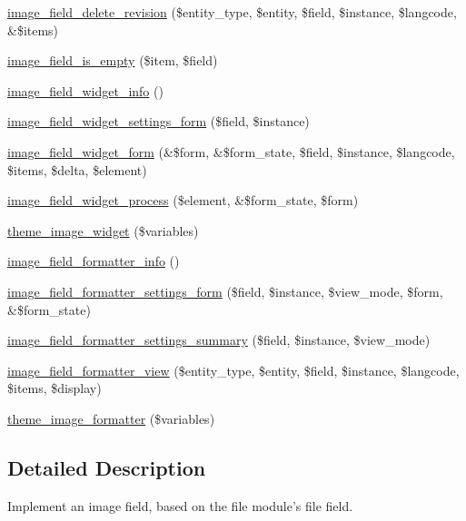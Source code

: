 \begin{DoxyCompactItemize}
\hyperlink{image_8field_8inc_a460a161a4443c74ca50c53a75c7136a4}{image\_\-field\_\-delete\_\-revision} (\$entity\_\-type, \$entity, \$field, \$instance, \$langcode, \&\$items)
\item 
\hyperlink{image_8field_8inc_ab622afc8da1677afd5a91fc89c1192e0}{image\_\-field\_\-is\_\-empty} (\$item, \$field)
\item 
\hyperlink{image_8field_8inc_a6ec5a26a8e2fcb61f177cccbe5e4e9a0}{image\_\-field\_\-widget\_\-info} ()
\item 
\hyperlink{image_8field_8inc_ab2ba9fe8f5569b05a3e8b5c28d0a62db}{image\_\-field\_\-widget\_\-settings\_\-form} (\$field, \$instance)
\item 
\hyperlink{image_8field_8inc_a31362f53c0480c28ab23092a49c329d8}{image\_\-field\_\-widget\_\-form} (\&\$form, \&\$form\_\-state, \$field, \$instance, \$langcode, \$items, \$delta, \$element)
\item 
\hyperlink{image_8field_8inc_a1d2843cf1187140d1924481f10359872}{image\_\-field\_\-widget\_\-process} (\$element, \&\$form\_\-state, \$form)
\item 
\hyperlink{group__themeable_ga455134ab57ea615adf71aaa27adf9e75}{theme\_\-image\_\-widget} (\$variables)
\item 
\hyperlink{image_8field_8inc_a8d8f3405a50964513fca7c96eff62baf}{image\_\-field\_\-formatter\_\-info} ()
\item 
\hyperlink{image_8field_8inc_a444be283783538860ecb910f01cabe20}{image\_\-field\_\-formatter\_\-settings\_\-form} (\$field, \$instance, \$view\_\-mode, \$form, \&\$form\_\-state)
\item 
\hyperlink{image_8field_8inc_ab45c6072856919957630510a04279fa6}{image\_\-field\_\-formatter\_\-settings\_\-summary} (\$field, \$instance, \$view\_\-mode)
\item 
\hyperlink{image_8field_8inc_a808448070b848b1212a51f4b18ce5122}{image\_\-field\_\-formatter\_\-view} (\$entity\_\-type, \$entity, \$field, \$instance, \$langcode, \$items, \$display)
\item 
\hyperlink{group__themeable_gac8bbf1cd8217fe56a699148d8713e09e}{theme\_\-image\_\-formatter} (\$variables)
\end{DoxyCompactItemize}


\subsection{Detailed Description}
Implement an image field, based on the file module's file field. 

